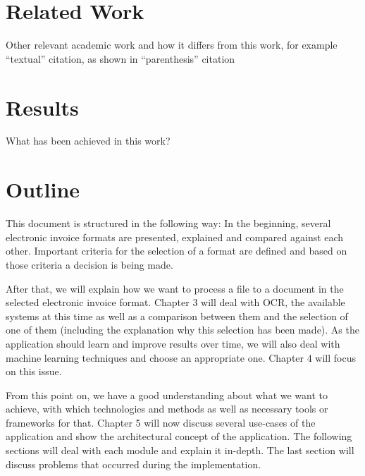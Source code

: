 \section{Related Work}

Other relevant academic work and how it differs from this work, for
example %
``textual'' citation, as shown in %
``parenthesis'' citation %



\section{Results}

What has been achieved in this work?


\section{Outline}

This document is structured in the following way: In the beginning, several electronic invoice formats are presented, explained and compared against each other. Important criteria for the selection of a format are defined and based on those criteria a decision is being made.

After that, we will explain how we want to process a file to a document in the selected electronic invoice format. Chapter 3 will deal with OCR, the available systems at this time as well as a comparison between them and the selection of one of them (including the explanation why this selection has been made).
As the application should learn and improve results over time, we will also deal with machine learning techniques and choose an appropriate one. Chapter 4 will focus on this issue.

From this point on, we have a good understanding about what we want to achieve, with which technologies and methods as well as necessary tools or frameworks for that. Chapter 5 will now discuss several use-cases of the application and show the architectural concept of the application. The following sections will deal with each module and explain it in-depth. The last section will discuss problems that occurred during the implementation.

